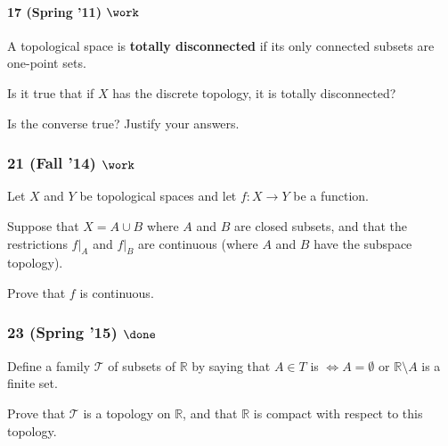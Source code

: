\hypertarget{spring-11-work}{%
\paragraph{\texorpdfstring{17 (Spring '11)
\(\work\)}{17 (Spring '11) \textbackslash work}}\label{spring-11-work}}

A topological space is \textbf{totally disconnected} if its only
connected subsets are one-point sets.

Is it true that if \(X\) has the discrete topology, it is totally
disconnected?

Is the converse true? Justify your answers.

\hypertarget{fall-14-work}{%
\subsubsection{\texorpdfstring{21 (Fall '14)
\(\work\)}{21 (Fall '14) \textbackslash work}}\label{fall-14-work}}

Let \(X\) and \(Y\) be topological spaces and let \(f : X \to Y\) be a
function.

Suppose that \(X = A \cup B\) where \(A\) and \(B\) are closed subsets,
and that the restrictions \(f \mathrel{\Big|}_A\) and
\(f \mathrel{\Big|}_B\) are continuous (where \(A\) and \(B\) have the
subspace topology).

Prove that \(f\) is continuous.

\hypertarget{spring-15-done}{%
\subsubsection{\texorpdfstring{23 (Spring '15)
\(\done\)}{23 (Spring '15) \textbackslash done}}\label{spring-15-done}}

Define a family \({\mathcal{T}}\) of subsets of \({\mathbb{R}}\) by
saying that \(A \in T\) is \(\iff A = \emptyset\) or
\({\mathbb{R}}\setminus A\) is a finite set.

Prove that \({\mathcal{T}}\) is a topology on \({\mathbb{R}}\), and that
\({\mathbb{R}}\) is compact with respect to this topology.

